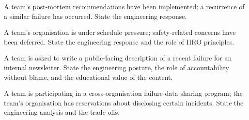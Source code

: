 \begin{exercise}
A team's post-mortem recommendations have been implemented; a recurrence of a similar failure has occurred. State the engineering response.
\end{exercise}

\begin{exercise}
A team's organisation is under schedule pressure; safety-related concerns have been deferred. State the engineering response and the role of HRO principles.
\end{exercise}

\begin{exercise}
A team is asked to write a public-facing description of a recent failure for an internal newsletter. State the engineering posture, the role of accountability without blame, and the educational value of the content.
\end{exercise}

\begin{exercise}
A team is participating in a cross-organisation failure-data sharing program; the team's organisation has reservations about disclosing certain incidents. State the engineering analysis and the trade-offs.
\end{exercise}
